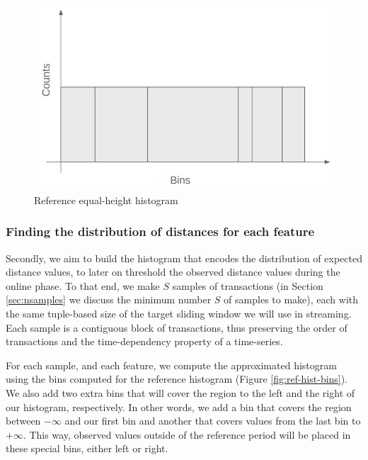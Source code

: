 \begin{figure}[!htb]
    \begin{center}
      \includegraphics[scale=0.4]{figures/ref-hist.png}
      \caption[]{Reference equal-height histogram}
      \label{fig:ref-hist}
    \end{center}
\end{figure}


\subsubsection*{Finding the distribution of distances for each feature} \label{sec:sampling-batch}

Secondly, we aim to build the histogram that encodes the distribution of expected distance values, to later on threshold the observed distance values during the online phase. To that end, we make $S$ samples of transactions (in Section \ref{sec:nsamples} we discuss the minimum number $S$ of samples to make), each with the same tuple-based size of the target sliding window we will use in streaming. Each sample is a contiguous block of transactions, thus preserving the order of transactions and the time-dependency property of a time-series. 

For each sample, and each feature, we compute the approximated histogram using the bins computed for the reference histogram (Figure \ref{fig:ref-hist-bins}). We also add two extra bins that will cover the region to the left and the right of our histogram, respectively. In other words, we add a bin that covers the region between $-\infty$ and our first bin and another that covers values from the last bin to $+\infty$. This way, observed values outside of the reference period will be placed in these special bins, either left or right.

